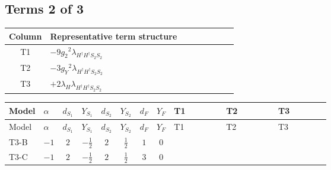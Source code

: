 \documentclass[8pt]{article}
\begin{document}
\begin{landscape}
\subsection*{Terms 2 of 3}
\begin{center}
\begin{tabular}{@{}c >{\raggedright\arraybackslash}p{0.82\linewidth}@{}}
\toprule
Column & Representative term structure \\
\midrule
T1 & \(\displaystyle -9 {g_2}^2 {\lambda_{H^\dagger H^\dagger S_2 S_2}}\) \\
\midrule
T2 & \(\displaystyle -3 {g_Y}^2 {\lambda_{H^\dagger H^\dagger S_2 S_2}}\) \\
\midrule
T3 & \(\displaystyle +2 {\lambda_H} {\lambda_{H^\dagger H^\dagger S_2 S_2}}\) \\
\midrule
\bottomrule
\end{tabular}
\end{center}
\smallskip
\tiny
\begin{longtable}{@{}llcccccc >{\raggedright\arraybackslash}p{0.21\linewidth} >{\raggedright\arraybackslash}p{0.21\linewidth} >{\raggedright\arraybackslash}p{0.21\linewidth}@{}}
\toprule
Model & $\alpha$ & $d_{S_1}$ & $Y_{S_1}$ & $d_{S_2}$ & $Y_{S_2}$ & $d_F$ & $Y_F$ & T1 & T2 & T3 \\
\midrule
\endfirsthead
\toprule
Model & $\alpha$ & $d_{S_1}$ & $Y_{S_1}$ & $d_{S_2}$ & $Y_{S_2}$ & $d_F$ & $Y_F$ & T1 & T2 & T3 \\
\midrule
\endhead
T3-B & $-1$ & $2$ & $-\frac{1}{2}$ & $2$ & $\frac{1}{2}$ & $1$ & $0$ & \scriptsize\adjustbox{max width=\linewidth}{$\begin{gathered} -9 {g_2}^2 {\lambda_{H^\dagger H^\dagger S_2 S_2}}\end{gathered}$} & \scriptsize\adjustbox{max width=\linewidth}{$\begin{gathered} -3 {g_Y}^2 {\lambda_{H^\dagger H^\dagger S_2 S_2}}\end{gathered}$} & \scriptsize\adjustbox{max width=\linewidth}{$\begin{gathered} +2 {\lambda_H} {\lambda_{H^\dagger H^\dagger S_2 S_2}}\end{gathered}$} \\
\midrule
T3-C & $-1$ & $2$ & $-\frac{1}{2}$ & $2$ & $\frac{1}{2}$ & $3$ & $0$ & \scriptsize\adjustbox{max width=\linewidth}{$\begin{gathered} -9 {g_2}^2 {\lambda_{H^\dagger H^\dagger S_2 S_2}}\end{gathered}$} & \scriptsize\adjustbox{max width=\linewidth}{$\begin{gathered} -3 {g_Y}^2 {\lambda_{H^\dagger H^\dagger S_2 S_2}}\end{gathered}$} & \scriptsize\adjustbox{max width=\linewidth}{$\begin{gathered} +2 {\lambda_H} {\lambda_{H^\dagger H^\dagger S_2 S_2}}\end{gathered}$} \\

\end{longtable}
\end{landscape}
\end{document}
